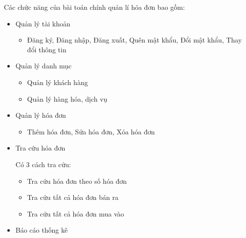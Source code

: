 Các chức năng của bài toán chính quản lí hóa đơn bao gồm:
\begin{itemize}



    \item Quản lý tài khoản

          \begin{itemize}
              \item Đăng ký, Đăng nhập, Đăng xuất, Quên mật khẩu, Đổi mật khẩu, Thay đổi thông tin
          \end{itemize}


    \item Quản lý danh mục

          \begin{itemize}

              \item Quản lý khách hàng

              \item Quản lý hàng hóa, dịch vụ

          \end{itemize}




    \item Quản lý hóa đơn

          \begin{itemize}

              \item Thêm hóa đơn, Sửa hóa đơn, Xóa hóa đơn

          \end{itemize}



    \item Tra cứu hóa đơn

          Có 3 cách tra cứu:

          \begin{itemize}

              \item Tra cứu hóa đơn theo số hóa đơn

              \item Tra cứu tất cả hóa đơn bán ra

              \item Tra cứu tất cả hóa đơn mua vào

          \end{itemize}



    \item Báo cáo thống kê


\end{itemize}
